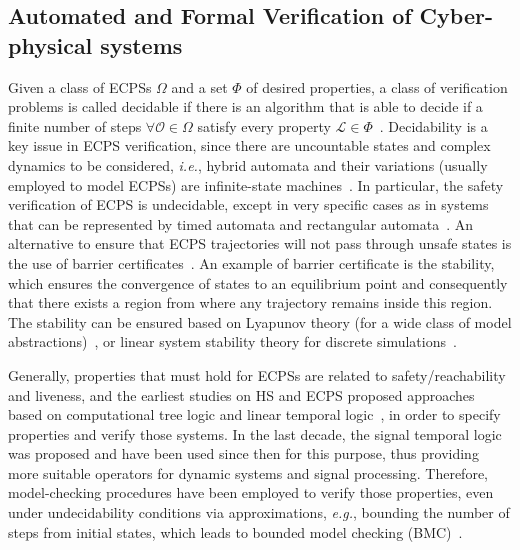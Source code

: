 \documentclass[format=acmsmall, review=false, screen=true]{acmart}
\begin{document}





\subsection{Automated and Formal Verification of Cyber-physical systems}
\label{ssec:verification}

Given a class of ECPSs $\Omega$ and a set $\Phi$ of desired properties, a class of verification problems is called decidable if there is an algorithm that is able to decide if a finite number of steps $\forall \mathcal{O}\in\Omega$ satisfy every property $\mathcal{L}\in \Phi$~\cite{Alur00}. Decidability is a key issue in ECPS verification, since there are uncountable states and complex dynamics to be considered, {\it i.e.}, hybrid automata and their variations (usually employed to model ECPSs) are infinite-state machines~\cite{Henzinger95}. In particular, the safety verification of ECPS is undecidable, except in very specific cases as in systems that can be represented by timed automata and rectangular automata~\cite{Alur11}. An alternative to ensure that ECPS trajectories will not pass through unsafe states is the use of barrier certificates~\cite{Prajna07,Prajna04}. An example of barrier certificate is the stability, which ensures the convergence of states to an equilibrium point and consequently that there exists a region from where any trajectory remains inside this region. The stability can be ensured based on Lyapunov theory (for a wide class of model abstractions)~\cite{tabuada2009verification}, or linear system stability theory for discrete simulations~\cite{Bessa17}. 


Generally, properties that must hold for ECPSs are related to safety/reachability and liveness, and the earliest studies on HS and ECPS proposed approaches based on computational tree logic and linear temporal logic~\cite{Alur93}, in order to specify properties and verify those systems. In the last decade, the signal temporal logic~\cite{Maler04,Donze12} was proposed and have been used since then for this purpose, thus providing more suitable operators for dynamic systems and signal processing. Therefore, model-checking procedures have been employed to verify those properties, even under undecidability conditions via approximations, {\it e.g.}, bounding the number of steps from initial states, which leads to bounded model checking (BMC)~\cite{Veanes09}. 
\end{document}

